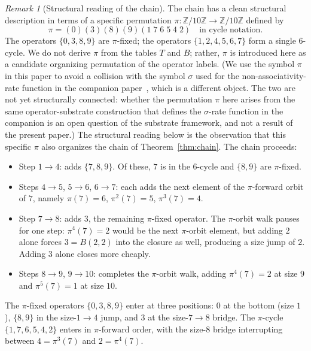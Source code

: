 \documentclass[11pt,reqno]{amsart}
\theoremstyle{plain}
\theoremstyle{definition}
\theoremstyle{remark}
\newtheorem*{remark}{Remark}
\newcommand{\Z}{\mathbb{Z}}
\newcommand{\Zten}{\Z/10\Z}
\begin{document}
\begin{remark}[Structural reading of the chain]\label{rem:sigma-walk}
The chain has a clean structural description in terms of a specific
permutation $\pi:\Zten\to\Zten$ defined by
\begin{equation}\label{eq:pi}
\pi=(0)(3)(8)(9)(1\;7\;6\;5\;4\;2)
\quad\text{in cycle notation.}
\end{equation}
The operators $\{0,3,8,9\}$ are $\pi$-fixed; the operators
$\{1,2,4,5,6,7\}$ form a single $6$-cycle. We do not derive
$\pi$ from the tables $T$ and $B$; rather, $\pi$ is introduced
here as a candidate organizing permutation of the operator
labels. (We use the symbol $\pi$ in this paper to avoid a
collision with the symbol $\sigma$ used for the
non-associativity-rate function in the companion
paper~\cite{SandersGish2026Sigma}, which is a different object.
The two are not yet structurally connected: whether the
permutation $\pi$ here arises from the same operator-substrate
construction that defines the $\sigma$-rate function in the
companion is an open question of the substrate framework, and
not a result of the present paper.) The structural reading below
is the observation that this specific $\pi$ also organizes the
chain of Theorem~\ref{thm:chain}. The chain proceeds:
\begin{itemize}\setlength\itemsep{0pt}
\item Step $1\to 4$: adds $\{7,8,9\}$. Of these, $7$ is in the
$6$-cycle and $\{8,9\}$ are $\pi$-fixed.
\item Steps $4\to 5$, $5\to 6$, $6\to 7$: each adds the next
element of the $\pi$-forward orbit of $7$, namely
$\pi(7)=6$, $\pi^{2}(7)=5$, $\pi^{3}(7)=4$.
\item Step $7\to 8$: adds $3$, the remaining $\pi$-fixed
operator. The $\pi$-orbit walk pauses for one step:
$\pi^{4}(7)=2$ would be the next $\pi$-orbit element, but
adding $2$ alone forces $3=B(2,2)$ into the closure as well,
producing a size jump of $2$. Adding $3$ alone closes more
cheaply.
\item Steps $8\to 9$, $9\to 10$: completes the $\pi$-orbit
walk, adding $\pi^{4}(7)=2$ at size $9$ and
$\pi^{5}(7)=1$ at size $10$.
\end{itemize}
The $\pi$-fixed operators $\{0,3,8,9\}$ enter at three
positions: $0$ at the bottom (size $1$), $\{8,9\}$ in the
size-$1\to 4$ jump, and $3$ at the size-$7\to 8$ bridge. The
$\pi$-cycle $\{1,7,6,5,4,2\}$ enters in $\pi$-forward order,
with the size-$8$ bridge interrupting between
$4=\pi^{3}(7)$ and $2=\pi^{4}(7)$.
\end{remark}
\end{document}
